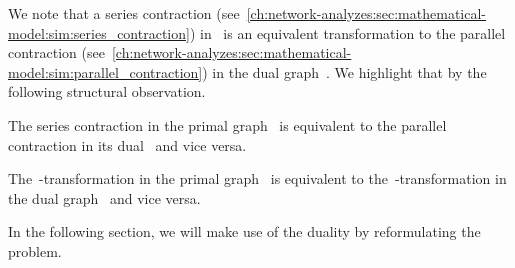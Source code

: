 We note that a series contraction
(see~\cref{ch:network-analyzes:sec:mathematical-model:sim:series_contraction})
in~ is an equivalent transformation to the parallel contraction
(see~\cref{ch:network-analyzes:sec:mathematical-model:sim:parallel_contraction})
in the dual graph~. We highlight that by the following
structural observation.
% 
\begin{observation}
    The series contraction in the primal graph~ is equivalent to the parallel
    contraction in its dual~ and vice versa.
    \label{ch:network-analyzes:sec:mathematical-model:obs:parallel-series-duality}
\end{observation}
% 
\begin{observation}
    The~\deltawye-transformation in the primal graph~ is equivalent to
    the~\wyedelta-transformation in the dual graph~ and
    vice versa.
    \label{ch:network-analyzes:sec:mathematical-model:obs:deltawye-wyedelta-duality}
\end{observation}
% 
In the following section, we will make use of the duality by reformulating the
problem.
% 
% 
